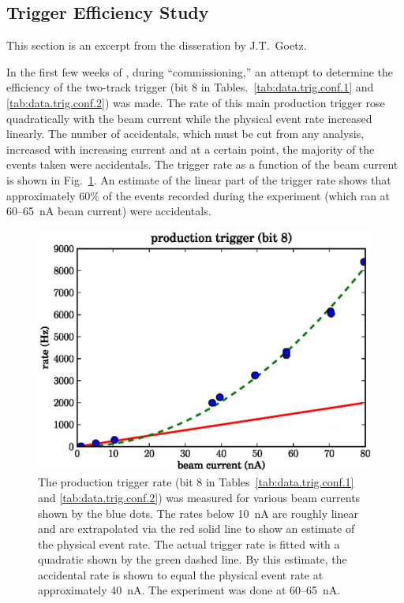 
\subsection{\label{sec:data.trig.eff}Trigger Efficiency Study}

\begin{center} \color{OliveGreen}
This section is an excerpt from the disseration by J.T.\ Goetz\cite{clas.thesis.goetz}.
\end{center}

In the first few weeks of , during ``commissioning,'' an attempt to determine the efficiency of the two-track trigger (bit 8 in Tables.~\ref{tab:data.trig.conf.1} and \ref{tab:data.trig.conf.2}) was made. The rate of this main production trigger rose quadratically with the beam current while the physical event rate increased linearly. The number of accidentals, which must be cut from any analysis, increased with increasing current and at a certain point, the majority of the events taken were accidentals. The trigger rate as a function of the beam current is shown in Fig.~\ref{fig:data.trig.eff}. An estimate of the linear part of the trigger rate shows that approximately 60\% of the events recorded during the  experiment (which ran at 60--65~nA beam current) were accidentals.

\begin{figure}\begin{center}
\includegraphics[width=0.7\columnwidth]{figures/calib/trig/trigger_study.eps}
\caption[Trigger Rate vs. Beam Current]{\label{fig:data.trig.eff}The production trigger rate (bit 8 in Tables~\ref{tab:data.trig.conf.1} and \ref{tab:data.trig.conf.2}) was measured for various beam currents shown by the blue dots. The rates below 10~nA are roughly linear and are extrapolated via the red solid line to show an estimate of the physical event rate. The actual trigger rate is fitted with a quadratic shown by the green dashed line. By this estimate, the accidental rate is shown to equal the physical event rate at approximately 40~nA. The  experiment was done at 60--65~nA.}
\end{center}\end{figure}

\clearpage
